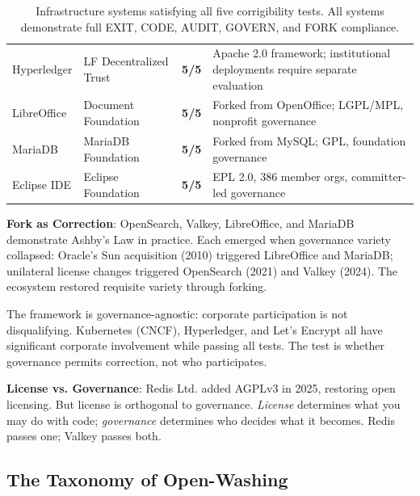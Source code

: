 \documentclass{article}
\begin{document}
\begin{table}[htbp]
\begin{tabular}{@{}l>{\raggedright}p{3.2cm}>{\centering\arraybackslash}p{1.2cm}p{5.8cm}@{}}
\rowcolor{green!8}
Hyperledger & LF Decentralized Trust & \textbf{5/5} & Apache 2.0 framework; institutional deployments require separate evaluation \\
LibreOffice & Document Foundation & \textbf{5/5} & Forked from OpenOffice; LGPL/MPL, nonprofit governance \\
\rowcolor{green!8}
MariaDB & MariaDB Foundation & \textbf{5/5} & Forked from MySQL; GPL, foundation governance \\
Eclipse IDE & Eclipse Foundation & \textbf{5/5} & EPL 2.0, 386 member orgs, committer-led governance \\
\bottomrule
\end{tabular}
\caption{Infrastructure systems satisfying all five corrigibility tests. All systems demonstrate full EXIT, CODE, AUDIT, GOVERN, and FORK compliance.}
\label{tab:positive}
\end{table}

\textbf{Fork as Correction}: OpenSearch, Valkey, LibreOffice, and MariaDB demonstrate Ashby's Law in practice. Each emerged when governance variety collapsed: Oracle's Sun acquisition (2010) triggered LibreOffice and MariaDB; unilateral license changes triggered OpenSearch (2021) and Valkey (2024). The ecosystem restored requisite variety through forking.

The framework is governance-agnostic: corporate participation is not disqualifying. Kubernetes (CNCF), Hyperledger, and Let's Encrypt all have significant corporate involvement while passing all tests. The test is whether governance permits correction, not who participates.

\textbf{License vs. Governance}: Redis Ltd. added AGPLv3 in 2025, restoring open licensing. But license is orthogonal to governance. \textit{License} determines what you may do with code; \textit{governance} determines who decides what it becomes. Redis passes one; Valkey passes both.

\subsection{The Taxonomy of Open-Washing}
\label{subsec:openwashing}
\end{document}
